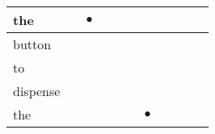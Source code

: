 \documentclass[landscape]{article}
\newcommand{\ssp}{\hspace{2pt}}
\newcommand{\mex}{\cellcolor{g}$\bullet$}
\begin{document}
\begin{tabular}{|l|p{10pt}|p{10pt}|p{10pt}|p{10pt}|p{10pt}|p{10pt}|p{10pt}|p{10pt}|p{10pt}|p{10pt}|}
\hline
\ssp \cellcolor{ref1}the \ssp&\hspace{2pt}&\hspace{2pt}\mex&\hspace{2pt}&\hspace{2pt}&\hspace{2pt}&\hspace{2pt}&\hspace{2pt}&\hspace{2pt}&\hspace{2pt}&\hspace{2pt}\\
\hline
\ssp button \ssp&\hspace{2pt}&\hspace{2pt}&\hspace{2pt}&\hspace{2pt}&\hspace{2pt}&\hspace{2pt}&\hspace{2pt}&\hspace{2pt}&\hspace{2pt}&\hspace{2pt}\\
\hline
\ssp to \ssp&\hspace{2pt}&\hspace{2pt}&\hspace{2pt}&\hspace{2pt}&\hspace{2pt}&\hspace{2pt}&\hspace{2pt}&\hspace{2pt}&\hspace{2pt}&\hspace{2pt}\\
\hline
\ssp dispense \ssp&\hspace{2pt}&\hspace{2pt}&\hspace{2pt}&\hspace{2pt}&\hspace{2pt}&\hspace{2pt}&\hspace{2pt}&\hspace{2pt}&\hspace{2pt}&\hspace{2pt}\\
\hline
\ssp \cellcolor{ref5}the \ssp&\hspace{2pt}&\hspace{2pt}&\hspace{2pt}&\hspace{2pt}&\hspace{2pt}&\hspace{2pt}\mex&\hspace{2pt}&\hspace{2pt}&\hspace{2pt}&\hspace{2pt}\\

\end{tabular}
\end{document}
